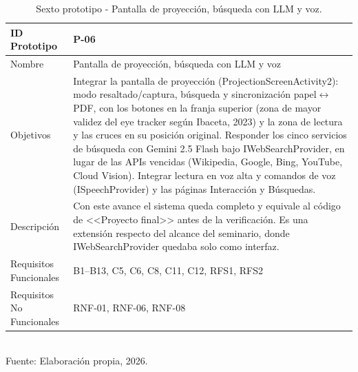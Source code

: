\begin{table}[h!]
\centering
\caption{Sexto prototipo - Pantalla de proyección, búsqueda con LLM y voz.}
\label{tab:prototipo-p06}
\begin{tabularx}{\textwidth}{|l|X|}
\hline
ID Prototipo & P-06 \\ \hline
Nombre & Pantalla de proyección, búsqueda con LLM y voz \\ \hline
Objetivos & Integrar la pantalla de proyección (ProjectionScreenActivity2): modo resaltado/captura, búsqueda y sincronización papel$\leftrightarrow$PDF, con los botones en la franja superior (zona de mayor validez del eye tracker según Ibaceta, 2023) y la zona de lectura y las cruces en su posición original. \newline Responder los cinco servicios de búsqueda con Gemini 2.5 Flash bajo IWebSearchProvider, en lugar de las APIs vencidas (Wikipedia, Google, Bing, YouTube, Cloud Vision). \newline Integrar lectura en voz alta y comandos de voz (ISpeechProvider) y las páginas Interacción y Búsquedas. \\ \hline
Descripción & Con este avance el sistema queda completo y equivale al código de <<Proyecto final>> antes de la verificación. Es una extensión respecto del alcance del seminario, donde IWebSearchProvider quedaba solo como interfaz. \\ \hline
Requisitos Funcionales & B1–B13, C5, C6, C8, C11, C12, RFS1, RFS2 \\ \hline
Requisitos No Funcionales & RNF-01, RNF-06, RNF-08 \\ \hline
\end{tabularx}
\\[2pt] {\small Fuente: Elaboración propia, 2026.}
\end{table}

